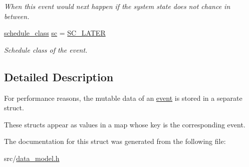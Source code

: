 \begin{DoxyCompactItemize}
\begin{DoxyCompactList}\small\item\em When this event would next happen if the system state does not chance in between. \end{DoxyCompactList}\item 
\mbox{\label{structtricl_1_1event__data_a7432a2cec652bbec048052510f57a987}} 
\hyperlink{namespacetricl_a2d47d7069cd7cc5daa413ded7ebd8206}{schedule\+\_\+class} \hyperlink{structtricl_1_1event__data_a7432a2cec652bbec048052510f57a987}{sc} = \hyperlink{namespacetricl_a2d47d7069cd7cc5daa413ded7ebd8206a36dfcabe451fb0ef7ca51b810f5c5c86}{S\+C\+\_\+\+L\+A\+T\+ER}
\begin{DoxyCompactList}\small\item\em Schedule class of the event. \end{DoxyCompactList}\end{DoxyCompactItemize}


\subsection{Detailed Description}
For performance reasons, the mutable data of an \hyperlink{structtricl_1_1event}{event} is stored in a separate struct. 

These structs appear as values in a map whose key is the corresponding event. 

The documentation for this struct was generated from the following file\+:\begin{DoxyCompactItemize}
\item 
src/\hyperlink{data__model_8h}{data\+\_\+model.\+h}\end{DoxyCompactItemize}
